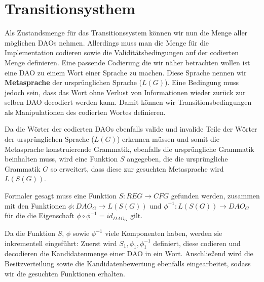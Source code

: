 \documentclass[a4paper,12pt]{report}
\begin{document}
% 

% 




\section*{Transitionsysthem}
Als Zustandsmenge für das Transitionssystem können wir nun die Menge aller möglichen DAOs nehmen. Allerdings muss man die Menge für die Implementation codieren sowie die Validitätsbedingungen auf der codierten Menge definieren. Eine passende Codierung die wir näher betrachten wollen ist eine DAO zu einem Wort einer Sprache zu machen. Diese Sprache nennen wir \textbf{Metasprache} der ursprünglichen Sprache ($L(G)$). Eine Bedingung muss jedoch sein, dass das Wort ohne Verlust von Informationen wieder zurück zur selben DAO decodiert werden kann. Damit können wir Transitionsbedingungen als Manipulationen des codierten Wortes definieren. 

Da die Wörter der codierten DAOs ebenfalls valide und invalide Teile der Wörter der ursprünglichen Sprache ($L(G)$) erkennen müssen und somit die Metasprache konstruierende Grammatik, ebenfalls die ursprüngliche Grammatik beinhalten muss, wird eine Funktion $S$ angegeben, die die ursprüngliche Grammatik $G$ so erweitert, dass diese zur gesuchten Metasprache wird $L(S(G))$.

Formaler gesagt muss eine Funktion $S: REG\rightarrow CFG$ gefunden werden, zusammen mit den Funktionen $\phi: DAO_G \rightarrow L(S(G))$ und $\phi^{-1}: L(S(G)) \rightarrow DAO_G$ für die die Eigenschaft $\phi\circ\phi^{-1} = id_{DAO_G}$ gilt.

Da die Funktion $S$, $\phi$ sowie $\phi^{-1}$ viele Komponenten haben, werden sie inkrementell eingeführt: Zuerst wird $S_1, \phi_1, \phi^{-1}_1$ definiert, diese codieren und decodieren die Kandidatenmenge einer DAO in ein Wort. Anschließend wird die Besitzverteilung sowie die Kandidatenbewertung ebenfalls eingearbeitet, sodass wir die gesuchten Funktionen erhalten.
\end{document}
